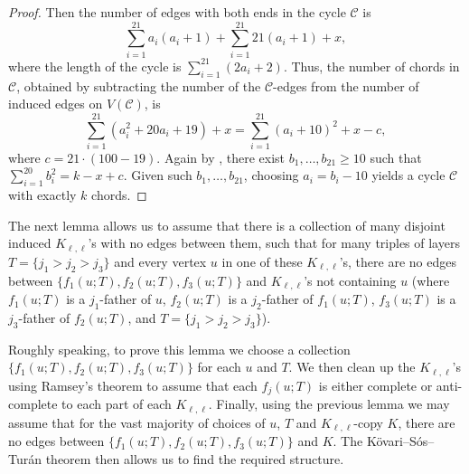 \documentclass[11pt,english]{article}
\theoremstyle{plain}
\theoremstyle{definition}
\theoremstyle{remark}
\newcommand{\C}{\mathcal{C}}
\begin{document}
\begin{proof}
            Then the number of edges with both ends in the cycle $\C$ is
            \begin{equation*}
                \sum_{i = 1}^{21} a_i(a_i + 1) + \sum_{i = 1}^{21} 21 (a_i + 1)+x, 
            \end{equation*}
            where the length of the cycle is $\sum_{i = 1}^{21} (2a_i + 2)$.
            Thus, the number of chords in $\C$, obtained by subtracting the number of the $\C$-edges from the number of induced edges on $V(\C)$, is
            \begin{equation*}
                \sum_{i = 1}^{21} (a_i^2 + 20 a_i + 19) +x
                = \sum_{i = 1}^{21} (a_i + 10)^2 +x - c,
            \end{equation*}
            where $c=21 \cdot (100 - 19)$.
            Again by , there exist $b_1, \ldots, b_{21} \ge 10$ such that $\sum_{i = 1}^{20} b_i^2 = k-x+ c$. Given such $b_1, \ldots, b_{21}$, choosing $a_i = b_i - 10$ yields a cycle $\C$ with exactly $k$ chords.
        \end{proof}
        
    
        The next lemma allows us to assume that there is a collection of many disjoint induced $K_{\ell,\ell}$'s with no edges between them, such that for many triples of layers $T = \{j_1 > j_2 > j_3\}$ and every vertex $u$ in one of these $K_{\ell,\ell}$'s, there are no edges between $\{f_1(u;T), f_2(u;T), f_3(u;T)\}$ and $K_{\ell,\ell}$'s not containing $u$ (where $f_1(u;T)$ is a $j_1$-father of $u$, $f_2(u;T)$ is a $j_2$-father of $f_1(u;T)$, $f_3(u;T)$ is a $j_3$-father of $f_2(u;T)$, and $T = \{j_1 > j_2 > j_3\}$). 
        
        Roughly speaking, to prove this lemma we choose a collection $\{f_1(u;T), f_2(u;T), f_3(u;T)\}$ for each $u$ and $T$. We then clean up the $K_{\ell,\ell}$'s using Ramsey's theorem to assume that each $f_j(u;T)$ is either complete or anti-complete to each part of each $K_{\ell,\ell}$. Finally, using the previous lemma we may assume that for the vast majority of choices of $u$, $T$ and $K_{\ell,\ell}$-copy $K$, there are no edges between $\{f_1(u;T), f_2(u;T), f_3(u;T)\}$ and $K$. The K\"ovari--S\'os--Tur\'an theorem then allows us to find the required structure.
        
\end{document}

